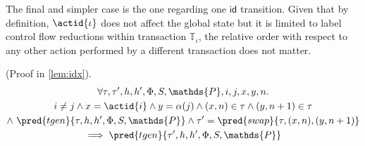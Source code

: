 The final and simpler case is the one regarding one $\mathsf{id}$ transition. Given that by definition, $\actid{\iota}$ does not affect the global state but it is limited to label control flow reductions within transaction $\mathds{T}_\iota$, the relative order with respect to any other action performed by a different transaction does not matter.
\begin{lem}
	(Proof in \ref{lem:idx}).
	\begin{gather*}
		\forall \tau, \tau', h, h', \Phi, S, \mathds{P}, i, j, x, y, n \ldotp \\
			i \neq j \land x = \actid{i} \land y = \alpha(j) \land (x, n) \in \tau \land (y, n+1) \in \tau \\ \land\ \pred{tgen}{\tau, h, h', \Phi, S, \mathds{P}} \land \tau' = \pred{swap}{\tau, (x, n), (y, n+1)}
			\\	 
		 \implies \pred{tgen}{\tau', h, h', \Phi, S, \mathds{P}}
	\end{gather*}
\end{lem}

